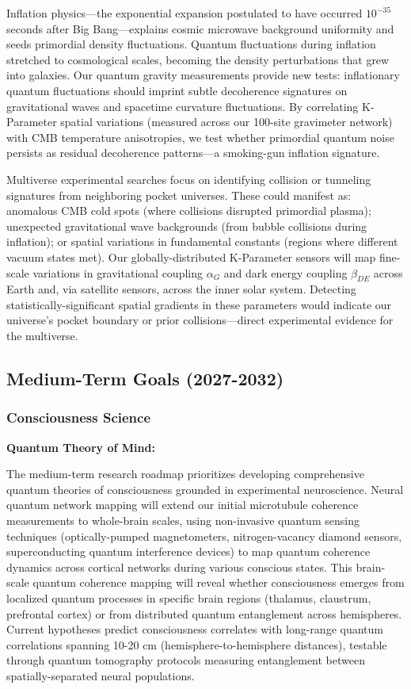 \documentclass[11pt,a4paper,twoside]{article}
\begin{document}
Inflation physics—the exponential expansion postulated to have occurred $10^{-35}$ seconds after Big Bang—explains cosmic microwave background uniformity and seeds primordial density fluctuations. Quantum fluctuations during inflation stretched to cosmological scales, becoming the density perturbations that grew into galaxies. Our quantum gravity measurements provide new tests: inflationary quantum fluctuations should imprint subtle decoherence signatures on gravitational waves and spacetime curvature fluctuations. By correlating K-Parameter spatial variations (measured across our 100-site gravimeter network) with CMB temperature anisotropies, we test whether primordial quantum noise persists as residual decoherence patterns—a smoking-gun inflation signature.

Multiverse experimental searches focus on identifying collision or tunneling signatures from neighboring pocket universes. These could manifest as: anomalous CMB cold spots (where collisions disrupted primordial plasma); unexpected gravitational wave backgrounds (from bubble collisions during inflation); or spatial variations in fundamental constants (regions where different vacuum states met). Our globally-distributed K-Parameter sensors will map fine-scale variations in gravitational coupling $\alpha_G$ and dark energy coupling $\beta_{DE}$ across Earth and, via satellite sensors, across the inner solar system. Detecting statistically-significant spatial gradients in these parameters would indicate our universe's pocket boundary or prior collisions—direct experimental evidence for the multiverse.

\subsection{Medium-Term Goals (2027-2032)}

\subsubsection{Consciousness Science}

\textbf{Quantum Theory of Mind:}

The medium-term research roadmap prioritizes developing comprehensive quantum theories of consciousness grounded in experimental neuroscience. Neural quantum network mapping will extend our initial microtubule coherence measurements to whole-brain scales, using non-invasive quantum sensing techniques (optically-pumped magnetometers, nitrogen-vacancy diamond sensors, superconducting quantum interference devices) to map quantum coherence dynamics across cortical networks during various conscious states. This brain-scale quantum coherence mapping will reveal whether consciousness emerges from localized quantum processes in specific brain regions (thalamus, claustrum, prefrontal cortex) or from distributed quantum entanglement across hemispheres. Current hypotheses predict consciousness correlates with long-range quantum correlations spanning 10-20 cm (hemisphere-to-hemisphere distances), testable through quantum tomography protocols measuring entanglement between spatially-separated neural populations.
\end{document}
